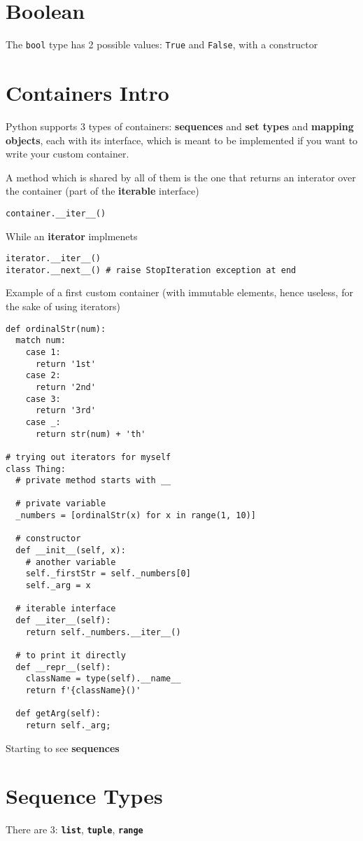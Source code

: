 \documentclass[10pt, openany]{article}
\begin{document}
  \section{Boolean}
  The \texttt{bool} type has 2 possible values: \texttt{True} and 
  \texttt{False}, with a constructor

  \section{Containers Intro}
  Python supports 3 types of containers: \textbf{sequences} and 
  \textbf{set types} and \textbf{mapping objects}, each with its
  interface, which is meant to be implemented if you want to write 
  your custom container.\par
  A method which is shared by all of them is the one that returns an
  interator over the container (part of the \textbf{iterable} 
  interface)
  \begin{lstlisting}
container.__iter__()
  \end{lstlisting}
  While an \textbf{iterator} implmenets
  \begin{lstlisting}
iterator.__iter__()
iterator.__next__() # raise StopIteration exception at end
  \end{lstlisting}
  Example of a first custom container (with immutable elements, 
  hence useless, for the sake of using iterators)
  \begin{lstlisting}
def ordinalStr(num):
  match num:
    case 1:
      return '1st'
    case 2:
      return '2nd'
    case 3:
      return '3rd'
    case _:
      return str(num) + 'th'

# trying out iterators for myself
class Thing:
  # private method starts with __

  # private variable
  _numbers = [ordinalStr(x) for x in range(1, 10)]

  # constructor
  def __init__(self, x):
    # another variable
    self._firstStr = self._numbers[0]
    self._arg = x

  # iterable interface
  def __iter__(self):
    return self._numbers.__iter__()

  # to print it directly
  def __repr__(self):
    className = type(self).__name__
    return f'{className}()'

  def getArg(self):
    return self._arg;
  \end{lstlisting}
  Starting to see \textbf{sequences}

  \section{Sequence Types}
  There are 3: \texttt{\textbf{list}}, 
  \texttt{\textbf{tuple}}, \texttt{\textbf{range}}\par
\end{document}
